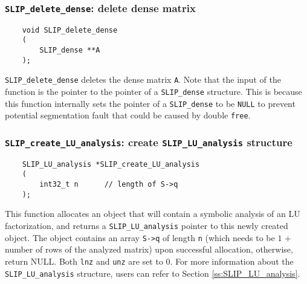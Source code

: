 \documentclass[12pt]{article}
\theoremstyle{definition}
\begin{document}
\cprotect\subsubsection{\verb|SLIP_delete_dense|: delete dense matrix}
\label{ss:delete_dense}

\begin{mdframed}[userdefinedwidth=6in]
{\footnotesize
\begin{verbatim}
    void SLIP_delete_dense
    (
        SLIP_dense **A
    );
\end{verbatim}
} \end{mdframed}

\verb|SLIP_delete_dense| deletes the dense matrix \verb|A|. Note that the input
of the function is the pointer to the pointer of a \verb|SLIP_dense| structure.
This is because this function internally sets the pointer of a
\verb|SLIP_dense| to be \verb|NULL| to prevent potential segmentation fault
that could be caused by double \verb|free|.

\cprotect\subsubsection{\verb|SLIP_create_LU_analysis|: create \verb|SLIP_LU_analysis| structure}
\label{ss:create_LU_analysis}

\begin{mdframed}[userdefinedwidth=6in]
{\footnotesize
\begin{verbatim}
    SLIP_LU_analysis *SLIP_create_LU_analysis
    (
        int32_t n      // length of S->q
    );
\end{verbatim}
} \end{mdframed}

This function allocates an object that will contain a symbolic analysis of an
LU factorization, and returns a \verb|SLIP_LU_analysis| pointer to this newly
created object.  The object contains an array \verb|S->q| of length \verb|n|
(which needs to be $1$ + number of rows of the analyzed matrix) upon successful
allocation, otherwise, return NULL. Both \verb|lnz| and \verb|unz| are set to
0. For more information about the \verb|SLIP_LU_analysis| structure, users can
refer to Section \ref{ss:SLIP_LU_analysis}.
\end{document}
